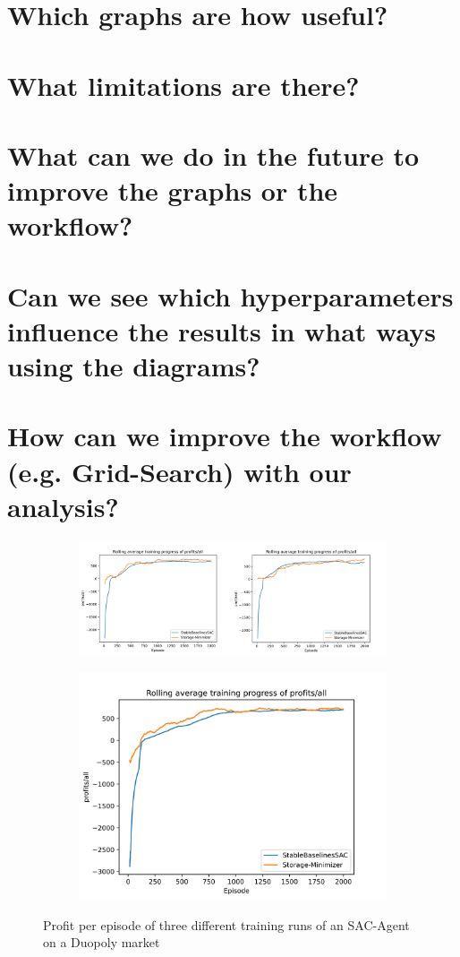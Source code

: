 \label{ch:AnalyzingGraphs}
\section*{Which graphs are how useful?}
\section*{What limitations are there?}
\section*{What can we do in the future to improve the graphs or the workflow?}
\section*{Can we see which hyperparameters influence the results in what ways using the diagrams?}
\section*{How can we improve the workflow (e.g. Grid-Search) with our analysis?}

\begin{figure}
	\begin{subfigure}{\textwidth}
		\centering
		\includegraphics[width = \textwidth]{images/experiments/SACDuopoly/SACDuopolyProfits1_2.pdf}\\[1 ex]
	\end{subfigure}
	\begin{subfigure}{\textwidth}
		\centering
		\includegraphics[width = .5\textwidth]{images/experiments/SACDuopoly/SACDuopolyProfits3.pdf}\\[1 ex]
	\end{subfigure}
	\caption{Profit per episode of three different training runs of an SAC-Agent on a Duopoly market}\label{fig:SACDuopolyProfits}
\end{figure}

